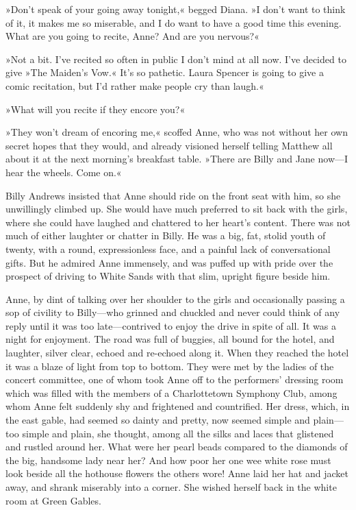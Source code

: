 »Don’t speak of your going away tonight,« begged Diana. »I don’t want to think of it, it makes me so miserable, and I do want to have a good time this evening. What are you going to recite, Anne? And are you nervous?«

»Not a bit. I’ve recited so often in public I don’t mind at all now. I’ve decided to give »The Maiden's Vow.« It’s so pathetic. Laura Spencer is going to give a comic recitation, but I’d rather make people cry than laugh.«

»What will you recite if they encore you?«

»They won’t dream of encoring me,« scoffed Anne, who was not without her own secret hopes that they would, and already visioned herself telling Matthew all about it at the next morning’s breakfast table. »There are Billy and Jane now—I hear the wheels. Come on.«

Billy Andrews insisted that Anne should ride on the front seat with him, so she unwillingly climbed up. She would have much preferred to sit back with the girls, where she could have laughed and chattered to her heart’s content. There was not much of either laughter or chatter in Billy. He was a big, fat, stolid youth of twenty, with a round, expressionless face, and a painful lack of conversational gifts. But he admired Anne immensely, and was puffed up with pride over the prospect of driving to White Sands with that slim, upright figure beside him.

Anne, by dint of talking over her shoulder to the girls and occasionally passing a sop of civility to Billy—who grinned and chuckled and never could think of any reply until it was too late—contrived to enjoy the drive in spite of all. It was a night for enjoyment. The road was full of buggies, all bound for the hotel, and laughter, silver clear, echoed and re-echoed along it. When they reached the hotel it was a blaze of light from top to bottom. They were met by the ladies of the concert committee, one of whom took Anne off to the performers’ dressing room which was filled with the members of a Charlottetown Symphony Club, among whom Anne felt suddenly shy and frightened and countrified. Her dress, which, in the east gable, had seemed so dainty and pretty, now seemed simple and plain—too simple and plain, she thought, among all the silks and laces that glistened and rustled around her. What were her pearl beads compared to the diamonds of the big, handsome lady near her? And how poor her one wee white rose must look beside all the hothouse flowers the others wore! Anne laid her hat and jacket away, and shrank miserably into a corner. She wished herself back in the white room at Green Gables.

